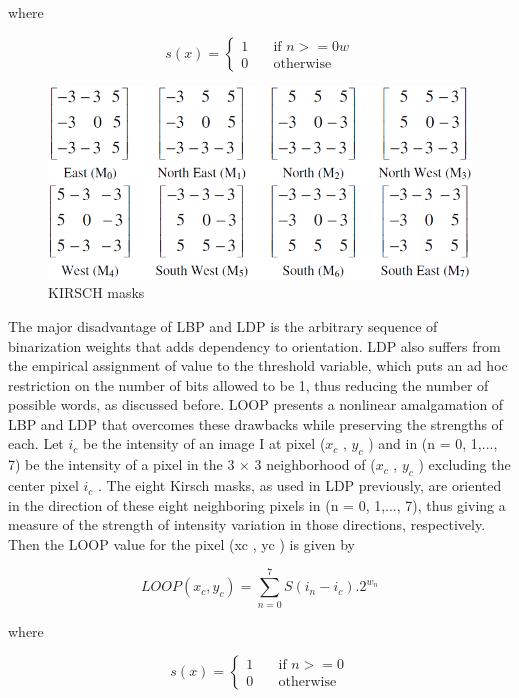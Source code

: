 \documentclass[conference]{IEEEtran}
\begin{document}
where

\[ s(x) =
  \begin{cases}
    1       & \quad \text{if } n>=0w\\
    0  & \quad \text{otherwise}
  \end{cases}
\]

\begin{figure}[htbp]
\centerline{\includegraphics[scale=0.27]{figures/fig4.png}}
\caption{KIRSCH masks}
\label{f4}
\end{figure}


The major disadvantage of LBP and LDP is the arbitrary sequence of binarization weights that adds dependency to orientation. LDP also suffers from the empirical assignment of value to the threshold variable, which puts an ad hoc restriction on the number of bits allowed to be 1, thus reducing the number of possible words, as discussed before. LOOP presents a nonlinear amalgamation of LBP and LDP that overcomes these drawbacks while preserving the strengths of each. Let $i_c$ be the intensity of an image I at pixel ($x_c$ , $y_c$ ) and in (n = 0, 1,..., 7) be the intensity of a pixel in the 3 × 3 neighborhood of ($x_c$ , $y_c$ ) excluding the center pixel $i_c$ . The eight Kirsch masks, as used in LDP previously, are oriented in the direction of these eight neighboring pixels in (n = 0, 1,..., 7), thus giving a measure of the strength of intensity variation in those directions, respectively. Then the LOOP value for the pixel (xc , yc ) is given by

\begin{equation}
\label{eq3}
LOOP (x_c , y_c ) = \sum\limits_{n=0}^{7} S(i_n - i_c).2^{w_{n}}
\end{equation}

where

\[ s(x) =
  \begin{cases}
    1       & \quad \text{if } n>=0\\
    0  & \quad \text{otherwise}
  \end{cases}
\]
\end{document}
